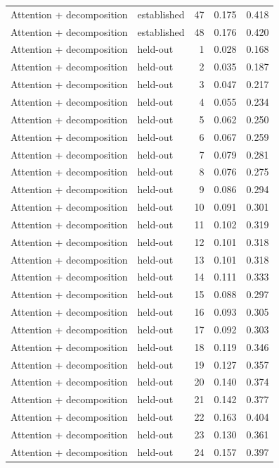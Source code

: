 \begin{tabular}{llrrr}
Attention + decomposition & established & 47 & 0.175 & 0.418 \\
Attention + decomposition & established & 48 & 0.176 & 0.420 \\
Attention + decomposition & held-out & 1 & 0.028 & 0.168 \\
Attention + decomposition & held-out & 2 & 0.035 & 0.187 \\
Attention + decomposition & held-out & 3 & 0.047 & 0.217 \\
Attention + decomposition & held-out & 4 & 0.055 & 0.234 \\
Attention + decomposition & held-out & 5 & 0.062 & 0.250 \\
Attention + decomposition & held-out & 6 & 0.067 & 0.259 \\
Attention + decomposition & held-out & 7 & 0.079 & 0.281 \\
Attention + decomposition & held-out & 8 & 0.076 & 0.275 \\
Attention + decomposition & held-out & 9 & 0.086 & 0.294 \\
Attention + decomposition & held-out & 10 & 0.091 & 0.301 \\
Attention + decomposition & held-out & 11 & 0.102 & 0.319 \\
Attention + decomposition & held-out & 12 & 0.101 & 0.318 \\
Attention + decomposition & held-out & 13 & 0.101 & 0.318 \\
Attention + decomposition & held-out & 14 & 0.111 & 0.333 \\
Attention + decomposition & held-out & 15 & 0.088 & 0.297 \\
Attention + decomposition & held-out & 16 & 0.093 & 0.305 \\
Attention + decomposition & held-out & 17 & 0.092 & 0.303 \\
Attention + decomposition & held-out & 18 & 0.119 & 0.346 \\
Attention + decomposition & held-out & 19 & 0.127 & 0.357 \\
Attention + decomposition & held-out & 20 & 0.140 & 0.374 \\
Attention + decomposition & held-out & 21 & 0.142 & 0.377 \\
Attention + decomposition & held-out & 22 & 0.163 & 0.404 \\
Attention + decomposition & held-out & 23 & 0.130 & 0.361 \\
Attention + decomposition & held-out & 24 & 0.157 & 0.397 \\

\end{tabular}
